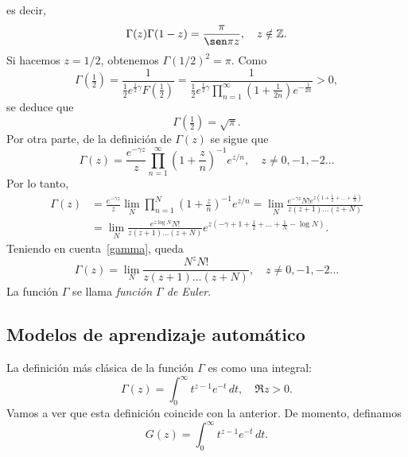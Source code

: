 \documentclass[11pt]{book}
\theoremstyle{plain} %
\theoremstyle{definition} %
\newcommand\Z{\mathbb{Z}}
\begin{document}
es decir,
\[
   \Gamma(z) \Gamma(1-z) = \frac{\pi}{\sen \pi z},
   \quad z \notin \Z.
\]
Si hacemos $z = 1/2$, obtenemos $\Gamma(1/2)^2 = \pi$. Como
\[
   \Gamma(\tfrac{1}{2}) 
   = \frac{1}{\frac{1}{2} e^{\frac{1}{2}\gamma} F(\frac{1}{2})}
   = \frac{1}{\frac{1}{2} e^{\frac{1}{2}\gamma} 
   \prod_{n=1}^\infty (1 + \frac{1}{2n}) e^{-\frac{1}{2n}}}
   > 0,
\]
se deduce que
\[
   \Gamma(\tfrac{1}{2}) = \sqrt{\pi}.
\]
Por otra parte, de la definición de $\Gamma(z)$ se sigue que
\[
   \Gamma(z) = \frac{e^{-\gamma z}}{z} 
   \prod_{n=1}^\infty \left(1 + \frac{z}{n}\right)^{-1} e^{z/n},
   \quad z \not= 0, -1, -2 \dots
\]
Por lo tanto,
\begin{align*}
   \Gamma(z) &= \frac{e^{-\gamma z}}{z} 
   \lim_N \prod_{n=1}^N \left(1 + \frac{z}{n}\right)^{-1} e^{z/n}
   = \lim_N \frac{e^{-\gamma z} N! e^{z(1+\frac{1}{2}+\dots+\frac{1}{N})}}
   {z (z+1) \dots (z+N)}
   \\
   &= \lim_N \frac{e^{z \log N} N!}{z (z+1) \dots (z+N)}
   e^{z(-\gamma+1+\frac{1}{2}+\dots+\frac{1}{N}-\log N)}.
\end{align*}
Teniendo en cuenta~\eqref{gamma}, queda
\[
   \Gamma(z) = \lim_N \frac{N^z N!}{z (z+1) \dots (z+N)},
   \quad z \not= 0, -1, -2 \dots
\]
La función $\Gamma$ se llama \emph{función $\Gamma$ de Euler}.

\subsection{Modelos de aprendizaje automático}
\label{Gamma-integral}

La definición más clásica de la función $\Gamma$ es como una integral:
\[
   \Gamma(z) = \int_0^\infty t^{z-1} e^{-t} \, dt,
   \quad \Re z > 0.
\]
Vamos a ver que esta definición coincide con la anterior. De momento, definamos
\[
   G(z) = \int_0^\infty t^{z-1} e^{-t} \, dt.
\]
\end{document}
